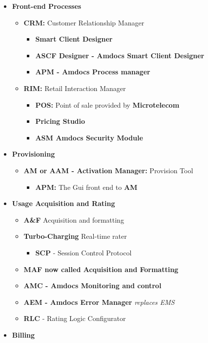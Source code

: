 \documentclass[12pt,twoside]{article}
\begin{document}
\begin{itemize}
\item \textbf{Front-end Processes}
\begin{itemize}
\item \textbf{CRM:} Customer Relationship Manager
\begin{itemize}
\item \textbf{Smart Client Designer}
\item \textbf{ASCF Designer - Amdocs Smart Client Designer}
\item \textbf{APM - Amdocs Process manager}
\end{itemize}
\item \textbf{RIM:}  Retail Interaction Manager
\begin{itemize}
\item \textbf{POS:} Point of sale provided by \textbf{Microtelecom}
\item \textbf{Pricing Studio}
\item \textbf{ASM Amdocs Security Module}
\end{itemize}
\end{itemize}
\item \textbf{Provisioning}
\begin{itemize}
\item \textbf{AM or AAM - Activation Manager:} Provision Tool
\begin{itemize}
\item \textbf{APM:} The Gui front end to \textbf{AM}
\end{itemize}
\end{itemize}
\item \textbf{Usage Acquisition and Rating}
\begin{itemize}
\item \textbf{A\&F} Acquisition and formatting
\item \textbf{Turbo-Charging} Real-time rater
\begin{itemize}
\item \textbf{SCP} - Session Control Protocol
\end{itemize}
\item \textbf{MAF now called Acquisition and Formatting}
\item \textbf{AMC - Amdocs Monitoring and control}
\item \textbf{AEM - Amdocs Error Manager} \emph{replaces EMS}
\item \textbf{RLC} - Rating Logic Configurator
\end{itemize}
\item \textbf{Billing}

\end{itemize}
\end{document}
